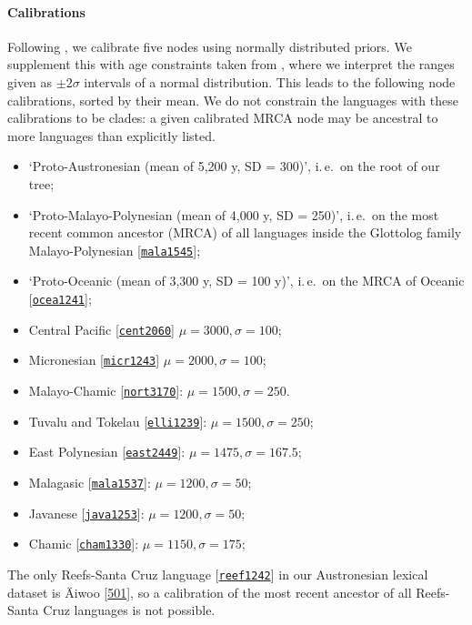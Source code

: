 \documentclass[]{rsos}%
\newcommand{\glot}[2]{#1 {\scriptsize{[\texttt{\href{https://glottolog.org/resource/languoid/id/#2}{#2}}]}}}
\begin{document}
\paragraph{Calibrations}
\newcommand{\abvd}[2]{#1 [\href{https://abvd.shh.mpg.de/austronesian/language.php?id=#2}{#2}]}
Following \textcite{greenhill2017evolutionary}, we calibrate five nodes using normally
distributed priors. We supplement this with age constraints taken from \textcite[Table S3]{gray2009language}, where we interpret the ranges given as $\pm 2\sigma$ intervals of a normal distribution. This leads to the following node calibrations, sorted by their mean. We do not constrain the languages with these calibrations to be clades: a given calibrated MRCA node may be ancestral to more languages than explicitly listed.
\begin{itemize}
\item ‘Proto-Austronesian (mean of 5,200 y, SD = 300)’, i.\,e.\ on the root of our tree;
\item ‘Proto-Malayo-Polynesian (mean of 4,000 y, SD = 250)’, i.\,e.\ on the most recent common ancestor (MRCA) of all languages inside the Glottolog family \glot{Malayo-Polynesian}{mala1545};
\item ‘Proto-Oceanic (mean of 3,300 y, SD = 100 y)’, i.\,e.\ on the MRCA of \glot{Oceanic}{ocea1241};
\item \glot{Central Pacific}{cent2060} $\mu=3000, \sigma=100$;
\item \glot{Micronesian}{micr1243} $\mu=2000, \sigma=100$;
\item \glot{Malayo-Chamic}{nort3170}: $\mu=1500, \sigma=250$.
\item \glot{Tuvalu and Tokelau}{elli1239}: $\mu=1500, \sigma=250$;
\item \glot{East Polynesian}{east2449}: $\mu=1475, \sigma=167.5$; 
\item \glot{Malagasic}{mala1537}: $\mu=1200, \sigma=50$;
\item \glot{Javanese}{java1253}: $\mu=1200, \sigma=50$;
\item \glot{Chamic}{cham1330}: $\mu=1150, \sigma=175$;
\end{itemize}
The only \glot{Reefs-Santa Cruz language}{reef1242} in our Austronesian lexical dataset is \abvd{Äiwoo}{501}, so a calibration of the most recent ancestor of all Reefs-Santa Cruz languages is not possible.
\end{document}
